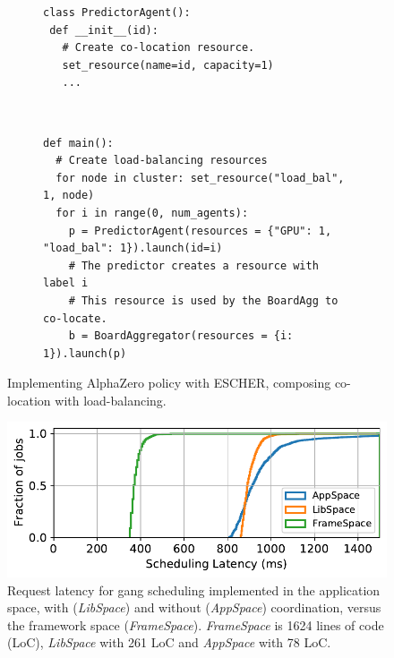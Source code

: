 \begin{figure}[t]
  \centering
\begin{subfigure}[t]{.3\textwidth}
  \centering
  \begin{verbatim}
class PredictorAgent():
 def __init__(id):
   # Create co-location resource.
   set_resource(name=id, capacity=1)
   ...
  \end{verbatim}
\end{subfigure}
~
~
\begin{subfigure}[t]{0.66\textwidth}
  \centering
  \begin{verbatim}
def main():
  # Create load-balancing resources
  for node in cluster: set_resource("load_bal", 1, node)
  for i in range(0, num_agents):
    p = PredictorAgent(resources = {"GPU": 1, "load_bal": 1}).launch(id=i)
    # The predictor creates a resource with label i
    # This resource is used by the BoardAgg to co-locate.
    b = BoardAggregator(resources = {i: 1}).launch(p)
  \end{verbatim}
\end{subfigure}
  \caption{Implementing AlphaZero policy with ESCHER, composing co-location with load-balancing.}
  \label{fig:alphazerocode}
\end{figure}




\begin{figure}[t]
\centering
\includegraphics[width=0.7\columnwidth]{escher/plots/result_gangsched_design_compare.pdf}
\caption{Request latency for gang scheduling implemented in the application space, with (\textit{LibSpace}) and without (\textit{AppSpace}) coordination, versus the framework space (\textit{FrameSpace}). \textit{FrameSpace} is 1624 lines of code (LoC), \textit{LibSpace} with 261 LoC and \textit{AppSpace} with 78 LoC.}
\label{fig:gangscheddesign-results}
\end{figure}

